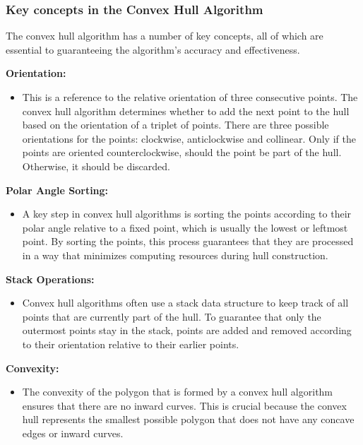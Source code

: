     \subsubsection{Key concepts in the Convex Hull Algorithm}
    The convex hull algorithm has a number of key concepts, all of which are essential to guaranteeing the algorithm's accuracy and effectiveness.

    \blankLine

    \textbf{Orientation:}
    \begin{itemize}
        \item This is a reference to the relative orientation of three consecutive points. The convex hull algorithm determines whether to add the next point to the hull based on the orientation of a triplet of points. There are three possible orientations for the points: clockwise, anticlockwise and collinear. Only if the points are oriented counterclockwise, should the point be part of the hull. Otherwise, it should be discarded.
    \end{itemize}

    \textbf{Polar Angle Sorting:}
    \begin{itemize}
        \item A key step in convex hull algorithms is sorting the points according to their polar angle relative to a fixed point, which is usually the lowest or leftmost point. By sorting the points, this process guarantees that they are processed in a way that minimizes computing resources during hull construction.
    \end{itemize}

    \textbf{Stack Operations:}
    \begin{itemize}
        \item Convex hull algorithms often use a stack data structure to keep track of all points that are currently part of the hull. To guarantee that only the outermost points stay in the stack, points are added and removed according to their orientation relative to their earlier points.
    \end{itemize}

    \textbf{Convexity:}
    \begin{itemize}
        \item The convexity of the polygon that is formed by a convex hull algorithm ensures that there are no inward curves. This is crucial because the convex hull represents the smallest possible polygon that does not have any concave edges or inward curves.
    \end{itemize} \autocite{Andi:keyConcepts}

